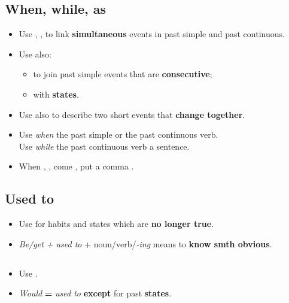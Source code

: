 \subsection{When, while, as}
\begin{itemize}
    \item Use , ,  to link \textbf{simultaneous} events in past simple and past continuous.
    \item[\doot] Use  also:
    \begin{itemize}
        \item[\daash] to join past simple events that are \textbf{consecutive};
        \item[\daash] with \textbf{states}.
    \end{itemize}
    \item[\doot] Use  also to describe two short events that \textbf{change together}.
    \item Use \textit{when}  the past simple or the past continuous verb. \\
    Use \textit{while}  the past continuous verb  a sentence.
    \item[\ast] When , ,  come , put a comma .
\end{itemize}

\subsection{Used to}
\begin{itemize}
    \item Use  for habits and states which are \textbf{no longer true}.
    \item[\doot] \textit{Be/get + used to} + noun/verb/\textit{-ing} means to \textbf{know smth obvious}.
\end{itemize}

\subsection{}
\begin{itemize}
    \item[\doot] Use .
    \item[\doot] \textit{Would} \textbf{=} \textit{used to} \textbf{except} for past \textbf{states}.
\end{itemize}

